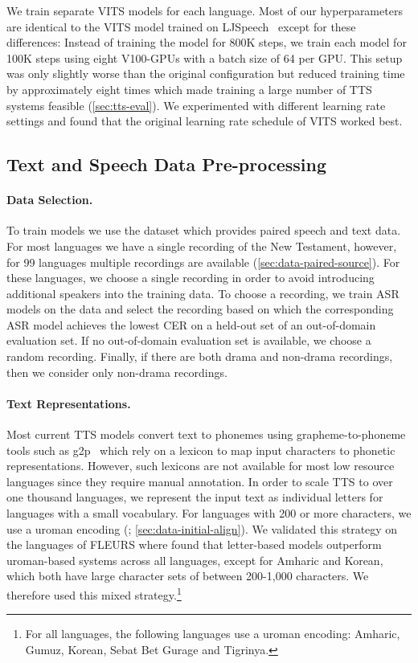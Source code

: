 We train separate VITS models for each language. 
Most of our hyperparameters are identical to the VITS model trained on LJSpeech~\citep{ljspeech17,kim2021conditional} except for these differences:
Instead of training the model for 800K steps, we train each model for 100K steps using eight V100-GPUs with a batch size of 64 per GPU.
This setup was only slightly worse than the original configuration but reduced training time by approximately eight times which made training a large number of TTS systems feasible (\textsection\ref{sec:tts-eval}).
We experimented with different learning rate settings and found that the original learning rate schedule of VITS worked best.


\subsection{Text and Speech Data Pre-processing}
\label{sec:tts-preprocess}

\paragraph{Data Selection.}
To train models we use the \MMS{} dataset which provides paired speech and text data.
For most languages we have a single recording of the New Testament, however, for 99 languages multiple recordings are available (\textsection\ref{sec:data-paired-source}). 
For these languages, we choose a single recording in order to avoid introducing additional speakers into the training data.
To choose a recording, we train ASR models on the data and select the recording based on which the corresponding ASR model achieves the lowest CER on a held-out set of an out-of-domain evaluation set. 
If no out-of-domain evaluation set is available, we choose a random recording. 
Finally, if there are both drama and non-drama recordings, then we consider only non-drama recordings.


\paragraph{Text Representations.}
Most current TTS models convert text to phonemes using grapheme-to-phoneme tools such as g2p~\citep{g2pE2019} which rely on a lexicon to map input characters to phonetic representations.
However, such lexicons are not available for most low resource languages since they require manual annotation.
In order to scale TTS to over one thousand languages, we represent the input text as individual letters for languages with a small vocabulary.
For languages with 200 or more characters, we use a uroman encoding (\citealt{hermjakob-etal-2018-box}; \textsection\ref{sec:data-initial-align}).
We validated this strategy on the languages of FLEURS where found that letter-based models outperform uroman-based systems across all languages, except for Amharic and Korean, which both have large character sets of between 200-1,000 characters.
We therefore used this mixed strategy.\footnote{
For all \nummmslang{} languages, the following languages use a uroman encoding: Amharic, Gumuz, Korean, Sebat Bet Gurage and Tigrinya.} 


